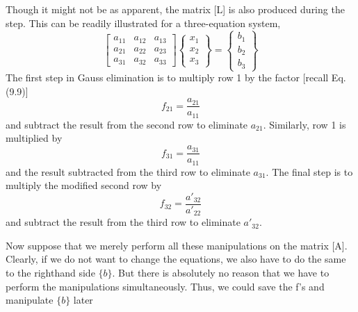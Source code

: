 \documentclass[../main.tex]{subfiles}
\begin{document}
Though it might not be as apparent, the matrix [L] is also produced during the step. This can be readily illustrated for a three-equation system,
\begin{equation}
\begin{bmatrix}
a_{11} &a_{12}  &a_{13} \\
a_{21} &a_{22}  &a_{23} \\
a_{31} &a_{32}  &a_{33}
\end{bmatrix}
\begin{Bmatrix}
x_{1}\\
x_{2}\\
x_{3}
\end{Bmatrix}=
\begin{Bmatrix}
b_{1}\\
b_{2}\\
b_{3}
\end{Bmatrix}
\end{equation}
The first step in Gauss elimination is to multiply row 1 by the factor [recall Eq. (9.9)]
\begin{equation}
f_{21}=\frac{a_{21}}{a_{11}}
\end{equation}
and subtract the result from the second row to eliminate $a_{21}$. Similarly, row 1 is multiplied by
\begin{equation}
f_{31}=\frac{a_{31}}{a_{11}}
\end{equation}
and the result subtracted from the third row to eliminate $a_{31}$. The final step is to multiply the modified second row by
\begin{equation}
f_{32}=\frac{a'_{32}}{a'_{22}}
\end{equation}
and subtract the result from the third row to eliminate $a'_{32}$.

Now suppose that we merely perform all these manipulations on the matrix [A]. Clearly, if we do not want to change the equations, we also have to do the same to the righthand side $\{b\}$. But there is absolutely no reason that we have to perform the manipulations simultaneously. Thus, we could save the f's and manipulate $\{b\}$ later
\end{document}
